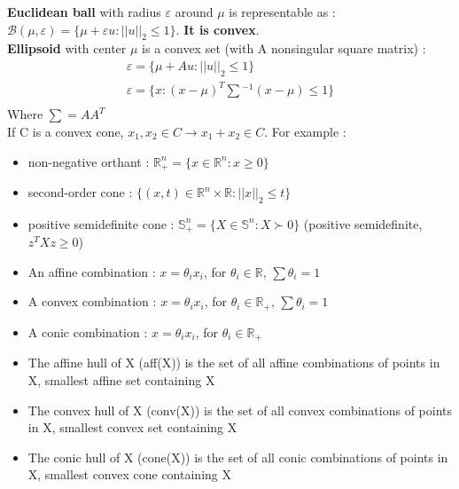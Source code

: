 \documentclass[../main.tex]{subfiles}
\begin{document}
\textbf{Euclidean ball} with radius $\varepsilon$ around $\mu$ is representable as : $\mathcal{B}(\mu, \varepsilon) = \{\mu + \varepsilon u :\lvert \lvert u \rvert \rvert_2 \leq 1\}$. \textbf{It is convex}.\\

\textbf{Ellipsoid} with center $\mu$ is a convex set (with A nonsingular square matrix) : \begin{equation}
    \begin{gathered}
        \varepsilon = \{\mu + Au : \lvert \lvert u\rvert \rvert_2 \leq 1 \}\\
        \varepsilon = \{ x : (x-\mu)^T \sum {}^{-1} (x-\mu) \leq 1\}\\
    \end{gathered}
\end{equation}
Where $\sum = AA^T$\\

\warning If C is a convex cone, $x_1, x_2 \in C \rightarrow x_1+x_2 \in C$. For example : \begin{itemize}
    \item non-negative orthant : $\mathbb{R}_+^n = \{x \in \mathbb{R}^n : x\geq 0\}$\\
    \item second-order cone : $\{(x,t) \in \mathbb{R}^n \times \mathbb{R} : \lvert \lvert x \rvert \rvert_2 \leq t \}$\\
    \item positive semidefinite cone : $\mathbb{S}^n_+ = \{X\in \mathbb{S}^n : X\succ 0 \}$  (positive semidefinite, $z^T X z \geq 0$)\\
\end{itemize}

\begin{itemize}
    \item An affine combination : $x = \theta_i x_i$, for $\theta_i \in \mathbb{R}$, $\sum\theta_i = 1$\\
    \item A convex combination : $x = \theta_i x_i$, for $\theta_i \in \mathbb{R}_+$, $\sum\theta_i = 1$\\
    \item A conic combination : $x = \theta_i x_i$, for $\theta_i \in \mathbb{R}_+$\\
\end{itemize}

\begin{itemize}
    \item The affine hull of X (aff(X)) is the set of all affine combinations of points in X, smallest affine set containing X\\
    \item The convex hull of X (conv(X)) is the set of all convex combinations of points in X, smallest convex set containing X\\
    \item The conic hull of X (cone(X)) is the set of all conic combinations of points in X, smallest convex cone containing X\\
\end{itemize}
\end{document}
